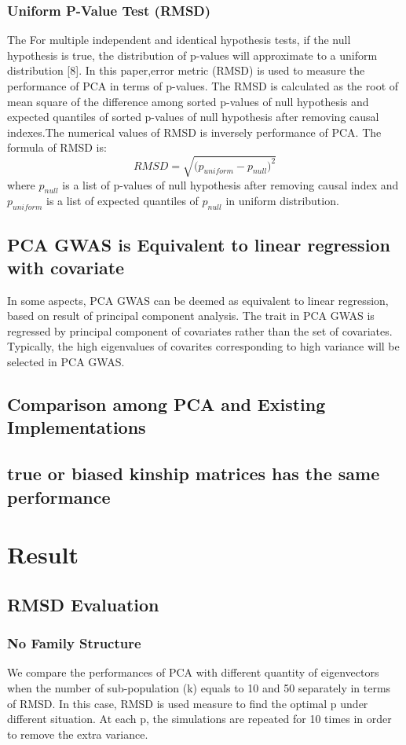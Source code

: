 \documentclass[12pt]{article}
\theoremstyle{definition}
\theoremstyle{plain}
\begin{document}
\subsubsection{Uniform P-Value Test (RMSD)}
The
For multiple independent and identical hypothesis tests, if the null hypothesis is true, the distribution of p-values will approximate to a uniform distribution [8]. In this paper,error metric (RMSD) is used to measure the performance of PCA in terms of p-values. The RMSD is calculated as the root of mean square of the difference among sorted p-values of null hypothesis and expected quantiles of sorted p-values of null hypothesis after removing causal indexes.The numerical values of RMSD is inversely  performance of PCA. The formula of RMSD is:
$$RMSD=\sqrt{{(p_{uniform}-p_{null}})^2}$$
where $p_{null}$ is a list of p-values of null hypothesis after removing causal index and $p_{uniform}$ is a list of expected quantiles of $p_{null}$ in uniform distribution.
\subsection{PCA GWAS  is Equivalent to linear regression with covariate}
In some aspects, PCA GWAS can be deemed as equivalent to linear regression, based on result of principal component analysis. The trait in PCA GWAS is regressed by principal component of covariates rather than the set of covariates. Typically, the high eigenvalues of covarites corresponding to high variance will be selected in PCA GWAS. 
\subsection{Comparison among PCA and Existing Implementations }


\subsection{true or biased kinship matrices has the same performance}



\section{Result}
\subsection{RMSD Evaluation}
\subsubsection{No Family Structure}
We compare the performances of PCA with different quantity of eigenvectors when the number of sub-population (k) equals to 10 and 50 separately in terms of RMSD. In this case,  RMSD is used measure to find the optimal p under different situation. At each p, the simulations are repeated for 10 times in order to remove the extra variance.\\
\end{document}
